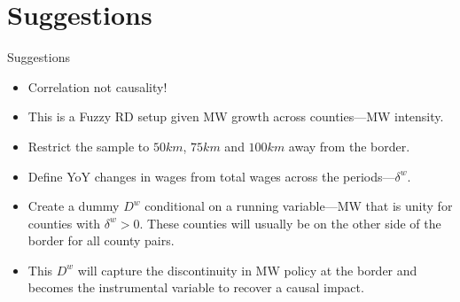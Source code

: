 \documentclass[aspectratio = 169]{beamer}
\begin{document}
    \section{Suggestions}\label{sec:suggestions}
    \begin{frame}{Suggestions}
        \begin{itemize}
            \item Correlation not causality!
            \item This is a Fuzzy RD setup given MW growth across counties---MW intensity.
            \item Restrict the sample to $50km$, $75km$ and $100km$ away from the border.
            \item Define YoY changes in wages from total wages across the periods---$\delta^{w}$.
            \item Create a dummy $D^{w}$ conditional on a running variable---MW that is unity for counties with $\delta^{w} > 0$. These counties will usually be on the other side of the border for all county pairs.
            \item This $D^{w}$ will capture the discontinuity in MW policy at the border and becomes the instrumental variable to recover a causal impact.
        \end{itemize}
    \end{frame}
\end{document}
